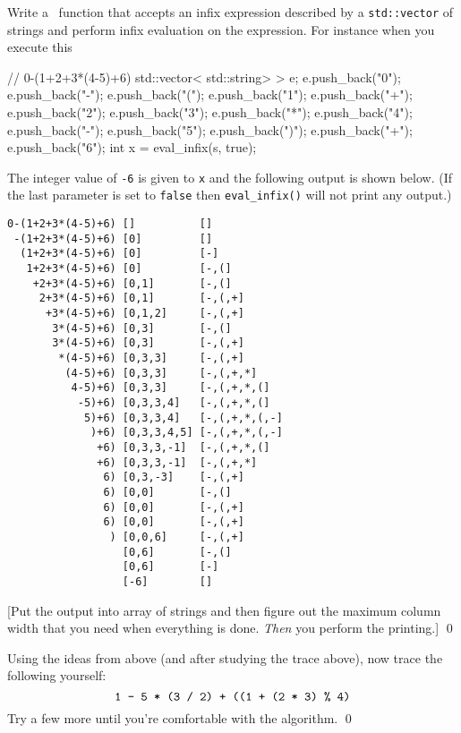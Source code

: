 \begin{ex}
Write a \cpp\ function that accepts an infix expression
described by a \verb!std::vector! of strings
and perform infix evaluation on the expression.
For instance
when you execute this
\begin{console}
// 0-(1+2+3*(4-5)+6)
std::vector< std::string> > e;
e.push_back("0");
e.push_back("-");
e.push_back("(");
e.push_back("1");
e.push_back("+");
e.push_back("2");
e.push_back("3");
e.push_back("*");
e.push_back("4");
e.push_back("-");
e.push_back("5");
e.push_back(")");
e.push_back("+");
e.push_back("6");
int x = eval_infix(s, true);
\end{console}
The integer value of \verb!-6! is given to \texttt{x} and
the following output is shown below.
(If the last parameter is set to \texttt{false} then \verb!eval_infix()!
will not print any output.)
{\small
\begin{Verbatim}[frame=single]
0-(1+2+3*(4-5)+6) []          []
 -(1+2+3*(4-5)+6) [0]         []
  (1+2+3*(4-5)+6) [0]         [-]
   1+2+3*(4-5)+6) [0]         [-,(]
    +2+3*(4-5)+6) [0,1]       [-,(]
     2+3*(4-5)+6) [0,1]       [-,(,+] 
      +3*(4-5)+6) [0,1,2]     [-,(,+] 
       3*(4-5)+6) [0,3]       [-,(]
       3*(4-5)+6) [0,3]       [-,(,+]
        *(4-5)+6) [0,3,3]     [-,(,+]
         (4-5)+6) [0,3,3]     [-,(,+,*]
          4-5)+6) [0,3,3]     [-,(,+,*,(]
           -5)+6) [0,3,3,4]   [-,(,+,*,(]  
            5)+6) [0,3,3,4]   [-,(,+,*,(,-]
             )+6) [0,3,3,4,5] [-,(,+,*,(,-]
              +6) [0,3,3,-1]  [-,(,+,*,(]
              +6) [0,3,3,-1]  [-,(,+,*]
               6) [0,3,-3]    [-,(,+]
               6) [0,0]       [-,(]
               6) [0,0]       [-,(,+]
               6) [0,0]       [-,(,+]
                ) [0,0,6]     [-,(,+]
                  [0,6]       [-,(]
                  [0,6]       [-]
                  [-6]        []
\end{Verbatim}
}
[Put the output into array of strings and then figure out the maximum column width
that you need when everything is done. \textit{Then} you perform the printing.]
\qed
\end{ex}
  

\begin{ex}
Using the ideas from above (and after studying the trace above),
now trace the following yourself:
\[
\text{\texttt{1 - 5 * (3 / 2) + ((1 + (2 * 3) \% 4)}}
\]
Try a few more until you're comfortable with the algorithm.
\qed
\end{ex}



